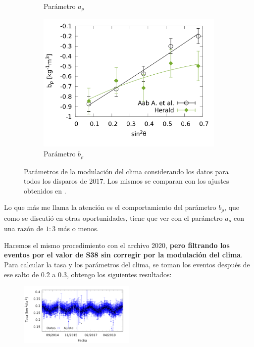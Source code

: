 \begin{figure}[H]
\begin{subfigure}[b]{0.5\textwidth}
					\caption{Parámetro $a_{\rho}$ }
					\label{fig:arho_2017_1EeV}
					\end{subfigure}%
					\hspace{\fill}
					\begin{subfigure}[b]{\textwidth}
					\centering
					\includegraphics[width=0.5\linewidth]{../Anisotropia/params/brho_2017_above_1EeV.png}
					\caption{Parámetro  $b_\rho$	 }
					\label{fig:brho_2017_1EeV}
					\end{subfigure}%
					\caption{Parámetros de la modulación del clima considerando los datos para todos los disparos de 2017. Los mismos se comparan con los ajustes obtenidos en \cite{aab2017impact}.}\label{fig:parameters_2017_1EeV}
				\end{figure}

				Lo que más me llama la atención es el comportamiento del parámetro $b_\rho$, que como se discutió en otras oportunidades, tiene que ver con el parámetro $a_\rho$ con una razón de  $1:3$ más o menos. 



			Hacemos el mismo procedimiento con el archivo 2020, {\bf pero filtrando los eventos por el valor de S38 sin corregir por la modulación del clima}. Para calcular la tasa y los parámetros del clima, se toman los eventos después de ese salto de 0.2 a 0.3, obtengo los siguientes resultados:

				\begin{figure}[H]
					\centering
					\includegraphics[width=0.5\textwidth]{../Anisotropia/daily_rate/daily_rate_AllTriggers_2020_1EeV.png}
				\end{figure}

